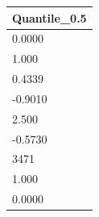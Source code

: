 \begin{tabular}{l}
\toprule
Quantile\_0.5 \\
\midrule
0.0000 \\
1.000 \\
0.4339 \\
-0.9010 \\
2.500 \\
-0.5730 \\
3471 \\
1.000 \\
0.0000 \\
\bottomrule
\end{tabular}